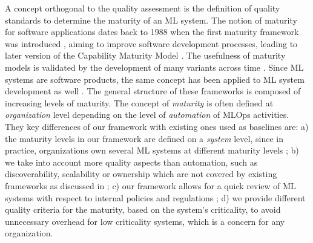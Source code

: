 %
%
A concept orthogonal to the quality assessment is the definition of quality standards to determine the maturity of an ML system. The notion of maturity for software applications dates back to 1988 when the first maturity framework was introduced \cite{software-process-maturity-framework}, aiming to improve software development processes, leading to later version of the Capability Maturity Model \cite{CMM}.
The usefulness of maturity models is validated by the development of many variants across time \cite{systematic-mapping-maturity-models, mat-model-software-product}. Since ML systems are software products, the same concept has been applied to ML system development as well \cite{AIMatModelReview}. The general structure of these frameworks is composed of increasing levels of maturity. The concept of \textit{maturity} is often defined at \textit{organization} level \cite{ibm-maturity-framework, mat-model-for-analysis} depending on the level of \textit{automation} \cite{Google-Mat-Model, Microsoft-Mat-Model, towardsMLOps-a-framework} of MLOps activities.
They key differences of our framework with existing ones used as baselines are: a) the maturity levels in our framework are defined on a \textit{system} level, since in practice, organizations own several ML systems at different maturity levels \cite{bernardi2019150}; b) we take into account more quality aspects than automation, such as discoverability, scalability or ownership which are not covered by existing frameworks \cite{Rubric} as discussed in \cite{chouliaras2023best}; c) our framework allows for a quick review of ML systems with respect to internal policies and regulations \cite{veale2021demystifying, de2021artificial, dixon2023principled}; d) we provide different quality criteria for the maturity, based on the system’s criticality, to avoid unnecessary overhead for low criticality systems, which is a concern for any organization.




